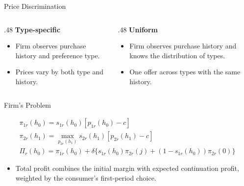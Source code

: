 \documentclass[aspectratio=169,professionalfonts]{beamer}
\newcommand{\shortbuttons}{}
\begin{document}
\gdef\shortbuttons{}
\begin{frame}[label=short-18]{Price Discrimination}
  \small
  \begin{columns}[T,onlytextwidth]
    \begin{column}{.48\textwidth}
      \small\textbf{Type-specific}
      \begin{itemize}
        \item Firm observes purchase history and preference type.
        \item Prices vary by both type and history.
      \end{itemize}
    \end{column}
    \begin{column}{.48\textwidth}
      \small\textbf{Uniform}
      \begin{itemize}
        \item Firm observes purchase history and knows the distribution of types.
        \item One offer across types with the same history.
      \end{itemize}
    \end{column}
  \end{columns}
\end{frame}


\gdef\shortbuttons{}
\begin{frame}[label=short-8]{Firm's Problem}
  \begingroup
  \setlength{\jot}{7pt}

    \begin{gather*}
      \pi_{1r}(h_0) = s_{1r}(h_0)[p_{1r}(h_0) - c] \\
      \pi_{2r}(h_1) = \max_{p_{2r}(h_1)} s_{2r}(h_1)[p_{2r}(h_1) - c] \\
      \Pi_r(h_0) = \pi_{1r}(h_0) + \delta\{s_{1r}(h_0)\pi_{2r}(j) + (1-s_{1r}(h_0))\pi_{2r}(0)\}
    \end{gather*}
  \endgroup
  \begin{itemize}
    \item Total profit combines the initial margin with expected continuation profit,
      weighted by the consumer's first-period choice.
  \end{itemize}
\end{frame}
\end{document}
